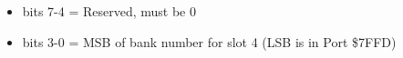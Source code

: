 \begin{itemize}
\item[] bits 7-4 = Reserved, must be 0
\item[] bits 3-0 = MSB of bank number for slot 4 (LSB is in Port \$7FFD)
\end{itemize}

